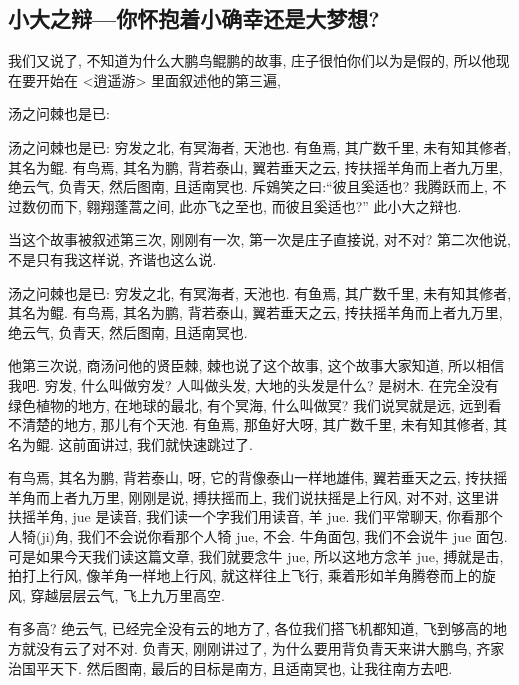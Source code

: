 \documentclass[11pt]{article}
\begin{document}
\subsection{\kaishu 小大之辩---你怀抱着小确幸还是大梦想?}

我们又说了, 不知道为什么大鹏鸟鲲鹏的故事, 庄子很怕你们以为是假的, 所以他现在要开始在 <逍遥游> 里面叙述他的第三遍, 

{\color{blue} 汤之问棘也是已:} 

{\color{blue} 汤之问棘也是已: 穷发之北, 有冥海者, 天池也. 有鱼焉, 其广数千里, 未有知其修者, 其名为鲲. 有鸟焉, 其名为鹏, 背若泰山, 翼若垂天之云, 抟扶摇羊角而上者九万里, 绝云气, 负青天, 然后图南, 且适南冥也. 斥鴳笑之曰:“彼且奚适也? 我腾跃而上, 不过数仞而下, 翱翔蓬蒿之间, 此亦飞之至也, 而彼且奚适也?” 此小大之辩也.}

当这个故事被叙述第三次, 刚刚有一次, 第一次是庄子直接说, 对不对? 第二次他说, 不是只有我这样说, 齐谐也这么说. 

\begin{center}
	{\color{magenta} 汤之问棘也是已: 穷发之北, 有冥海者, 天池也. 有鱼焉, 其广数千里, 未有知其修者, 其名为鲲. 有鸟焉, 其名为鹏, 背若泰山, 翼若垂天之云, 抟扶摇羊角而上者九万里, 绝云气, 负青天, 然后图南, 且适南冥也.}
\end{center}

\vspace{-0.5cm}

他第三次说, 商汤问他的贤臣棘, 棘也说了这个故事, 这个故事大家知道, 所以相信我吧. 穷发, 什么叫做穷发? 人叫做头发, 大地的头发是什么? 是树木. 在完全没有绿色植物的地方, 在地球的最北, 有个冥海, 什么叫做冥? 我们说冥就是远, 远到看不清楚的地方, 那儿有个天池. {\color{blue} 有鱼焉}, 那鱼好大呀, {\color{blue} 其广数千里, 未有知其修者, 其名为鲲.}  这前面讲过, 我们就快速跳过了.

{\color{blue} 有鸟焉, 其名为鹏, 背若泰山}, 呀, 它的背像泰山一样地雄伟, {\color{blue} 翼若垂天之云, 抟扶摇羊角而上者九万里}, 刚刚是说, {\color{blue} 搏扶摇而上}, 我们说扶摇是上行风, 对不对, 这里讲扶摇羊角, jue 是读音, 我们读一个字我们用读音, 羊 jue. 我们平常聊天, 你看那个人犄(ji)角, 我们不会说你看那个人犄 jue, 不会. 牛角面包, 我们不会说牛 jue 面包. 可是如果今天我们读这篇文章, 我们就要念牛 jue, 所以这地方念羊 jue, 搏就是击, 拍打上行风, 像羊角一样地上行风, 就这样往上飞行, 乘着形如羊角腾卷而上的旋风, 穿越层层云气, 飞上九万里高空. 

有多高? {\color{blue} 绝云气}, 已经完全没有云的地方了, 各位我们搭飞机都知道, 飞到够高的地方就没有云了对不对. {\color{blue} 负青天}, 刚刚讲过了, 为什么要用背负青天来讲大鹏鸟, 齐家治国平天下. {\color{blue} 然后图南}, 最后的目标是南方, {\color{blue} 且适南冥也}, 让我往南方去吧. 
\end{document}
